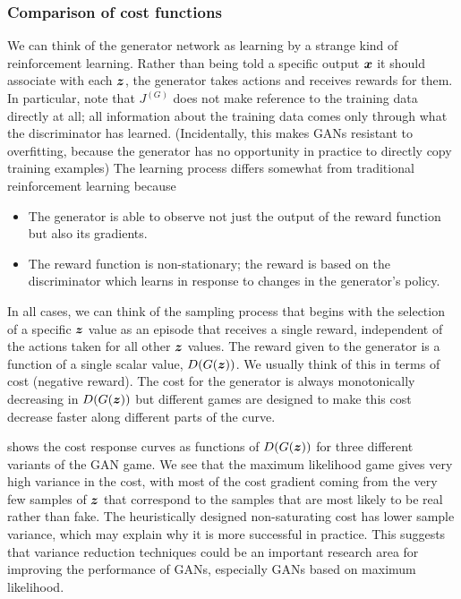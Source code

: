 \subsubsection{Comparison of cost functions}

We can think of the generator network as learning by a strange kind of reinforcement
learning.
Rather than being told a specific output ${\bm{x}}$ it should associate with each ${\bm{z}}$,
the generator takes actions and receives rewards for them.
In particular, note that $J^{(G)}$ does not make reference to the training data
directly at all; all information about the training data comes only through what
the discriminator has learned. (Incidentally, this makes GANs resistant to overfitting,
because the generator has no opportunity in practice to directly copy training examples)
The learning process differs somewhat from traditional reinforcement learning because
\begin{itemize}
 \item The generator is able to observe not just the output of the reward function but
   also its gradients.
 \item The reward function is non-stationary; the reward is based on the discriminator
   which learns in response to changes in the generator's policy.
   \end{itemize}

In all cases, we can think of the sampling process that begins with the selection of
a specific ${\bm{z}}$ value as an episode that receives a single reward, independent of the
actions taken for all other ${\bm{z}}$ values.
The reward given to the generator is a function of a single scalar value,
$D(G({\bm{z}}))$.
We usually think of this in terms of cost (negative reward).
The cost for the generator is always monotonically decreasing in $D(G({\bm{z}}))$ but
different games are designed to make this cost decrease faster along different parts of the curve.

 shows the cost response curves as functions of $D(G({\bm{z}}))$ for three
different variants of the GAN game.
We see that the maximum likelihood game gives very high variance in the cost, with most of the
cost gradient coming from the very few samples of ${\bm{z}}$ that correspond to the samples that
are most likely to be real rather than fake.
The heuristically designed non-saturating cost has lower sample variance, which may explain
why it is more successful in practice.
  This suggests that variance reduction techniques could be an important research area
  for improving the performance of GANs, especially GANs based on maximum likelihood.

